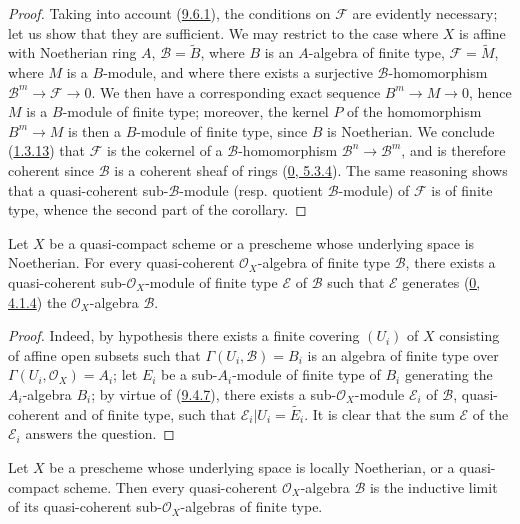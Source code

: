 \begin{proof}
Taking into account (\hyperref[I.9.6.1]{9.6.1}), the conditions on
$\mathscr{F}$ are evidently necessary; let us show that they are
sufficient. We may restrict to the case where $X$ is affine with Noetherian
ring $A$, $\mathscr{B}=\widetilde{B}$, where $B$ is an $A$-algebra of
finite type, $\mathscr{F}=\widetilde{M}$, where $M$ is a $B$-module, and
where there exists a surjective $\mathscr{B}$-homomorphism
$\mathscr{B}^m\to\mathscr{F}\to 0$. We then have a corresponding exact
sequence $B^m\to M\to 0$, hence $M$ is a $B$-module of finite type;
moreover, the kernel $P$ of the homomorphism $B^m\to M$ is then a
$B$-module of finite type, since $B$ is Noetherian. We conclude
(\hyperref[I.1.3.13]{1.3.13}) that $\mathscr{F}$ is the cokernel of a
$\mathscr{B}$-homomorphism $\mathscr{B}^n\to\mathscr{B}^m$, and is therefore
coherent since $\mathscr{B}$ is a coherent sheaf of rings
(\hyperref[0.5.3.4]{0, 5.3.4}). The same reasoning shows that a
quasi-coherent sub-$\mathscr{B}$-module (resp. quotient $\mathscr{B}$-module)
of $\mathscr{F}$ is of finite type, whence the second part of the
corollary.
\end{proof}

\begin{proposition}[9.6.5]
\label{I.9.6.5}
Let $X$ be a quasi-compact scheme or a prescheme whose underlying space
is Noetherian. For every quasi-coherent $\mathscr{O}_X$-algebra of finite
type $\mathscr{B}$, there exists a quasi-coherent sub-$\mathscr{O}_X$-module
of finite type $\mathscr{E}$ of $\mathscr{B}$ such that $\mathscr{E}$
generates (\hyperref[0.4.1.4]{0, 4.1.4}) the $\mathscr{O}_X$-algebra
$\mathscr{B}$.
\end{proposition}

\begin{proof}
Indeed, by hypothesis there exists a finite covering $(U_i)$ of $X$
consisting of affine open subsets such that $\Gamma(U_i,\mathscr{B})=B_i$ is
an algebra of finite type over $\Gamma(U_i,\mathscr{O}_X)=A_i$; let $E_i$ be
a sub-$A_i$-module of finite type of $B_i$ generating the $A_i$-algebra
$B_i$; by virtue of (\hyperref[I.9.4.7]{9.4.7}), there exists a
sub-$\mathscr{O}_X$-module $\mathscr{E}_i$ of $\mathscr{B}$,
quasi-coherent and of finite type, such that
$\mathscr{E}_i|U_i=\widetilde{E_i}$. It is clear that the sum
$\mathscr{E}$ of the $\mathscr{E}_i$ answers the question.
\end{proof}

\begin{proposition}[9.6.6]
\label{I.9.6.6}
Let $X$ be a prescheme whose underlying space is locally Noetherian,
or a quasi-compact scheme. Then every quasi-coherent $\mathscr{O}_X$-algebra
$\mathscr{B}$ is the inductive limit of its quasi-coherent
sub-$\mathscr{O}_X$-algebras of finite type.
\end{proposition}

